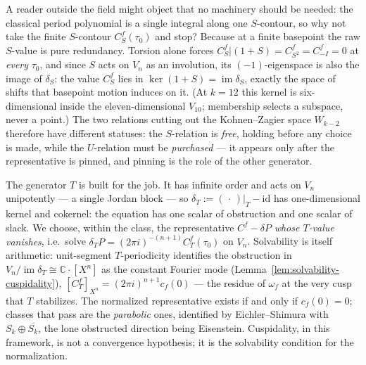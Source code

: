 \documentclass[11pt]{article}
\newcommand{\CC}{\mathbb{C}}
\DeclareMathOperator{\im}{im}
\begin{document}
A reader outside the field might object that no machinery should be
needed: the classical period polynomial is a single integral along one
$S$-contour, so why not take the finite $S$-contour $C^f_S(\tau_0)$ and
stop?  Because at a finite basepoint the raw $S$-value is pure
redundancy.  Torsion alone forces
$C^f_S\big|(1+S) = C^f_{S^2} = C^f_{-I} = 0$ at \emph{every} $\tau_0$,
and since $S$ acts on $V_n$ as an involution, its $(-1)$-eigenspace is
also the image of $\delta_S$: the value $C^f_S$ lies in
$\ker(1+S) = \im \delta_S$, exactly the space of shifts that basepoint
motion induces on it.  (At $k = 12$ this kernel is six-dimensional
inside the eleven-dimensional $V_{10}$; membership selects a subspace,
never a point.)  The two relations cutting out the Kohnen--Zagier space
$W_{k-2}$ \cite{KZ1984} therefore have different statuses: the
$S$-relation is \emph{free}, holding before any choice is made, while
the $U$-relation must be \emph{purchased} --- it appears only after the
representative is pinned, and pinning is the role of the other
generator.

The generator $T$ is built for the job.  It has infinite order and acts
on $V_n$ unipotently --- a single Jordan block --- so
$\delta_T := (\,\cdot\,)|_T - \mathrm{id}$ has one-dimensional kernel
and cokernel: the equation has one scalar of obstruction and one scalar
of slack.  We choose, within the class, the representative
$C^f - \delta P$ \emph{whose $T$-value vanishes}, i.e.\ solve
$\delta_T P = (2\pi i)^{-(n+1)} C^f_T(\tau_0)$ on $V_n$.  Solvability is
itself arithmetic: unit-segment $T$-periodicity identifies the
obstruction in $V_n / \im \delta_T \cong \CC \cdot [X^n]$ as the
constant Fourier mode (Lemma~\ref{lem:solvability-cuspidality}),
$[C^f_T]_{X^n} = (2\pi i)^{n+1} c_f(0)$ --- the residue of $\omega_f$ at
the very cusp that $T$ stabilizes.  The normalized representative exists
if and only if $c_f(0) = 0$; classes that pass are the \emph{parabolic}
ones, identified by Eichler--Shimura \cite{KZ1984} with
$S_k \oplus \overline{S_k}$, the lone obstructed direction being
Eisenstein.  Cuspidality, in this framework, is not a convergence
hypothesis; it is the solvability condition for the normalization.
\end{document}
